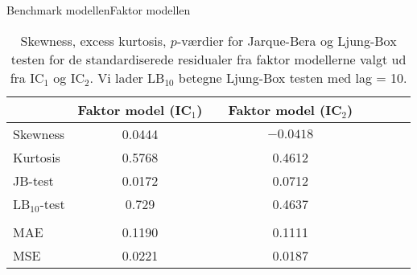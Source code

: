 \begin{frame}{Benchmark modellen}{Faktor modellen}
\begin{table}
\center
\begin{tabular}{lccccccc} \toprule
& Faktor model (IC$_1$) & & Faktor model (IC$_2$)  \\ \midrule
Skewness & 0.0444 & & $-0.0418$     \\
Kurtosis & 0.5768 & & 0.4612 \\
JB-test & 0.0172 & & 0.0712 \\ 
LB$_{10}$-test & 0.729  && 0.4637  \\ 
\\
MAE & 0.1190 & & 0.1111 \\ 
MSE &  0.0221  & & 0.0187 \\ \bottomrule
\end{tabular}
\caption{Skewness, excess kurtosis, $p$-værdier for Jarque-Bera og Ljung-Box testen for de standardiserede residualer fra faktor modellerne valgt ud fra IC$_1$ og IC$_2$. 
Vi lader LB$_{10}$ betegne Ljung-Box testen med lag = 10. } \label{tab:test_faktor}
\end{table}
\end{frame}

